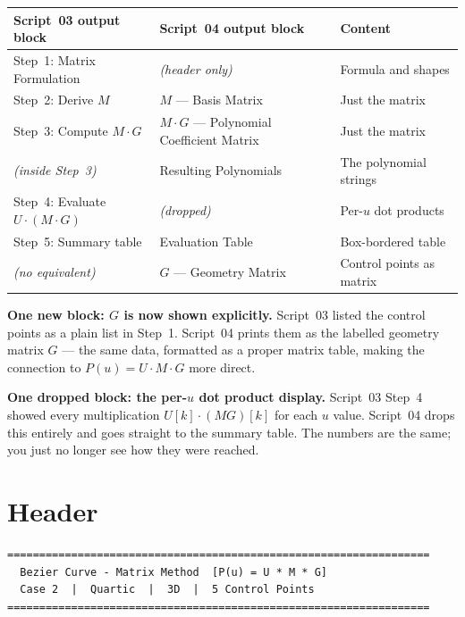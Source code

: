 \documentclass[12pt, a4paper]{article}
\begin{document}
\begin{center}
\begin{tabular}{lll}
\toprule
Script~03 output block & Script~04 output block & Content \\
\midrule
Step~1: Matrix Formulation & \textit{(header only)} & Formula and shapes \\
Step~2: Derive $M$ & $M$ --- Basis Matrix & Just the matrix \\
Step~3: Compute $M \cdot G$ & $M \cdot G$ --- Polynomial Coefficient Matrix & Just the matrix \\
\textit{(inside Step~3)} & Resulting Polynomials & The polynomial strings \\
Step~4: Evaluate $U \cdot (M \cdot G)$ & \textit{(dropped)} & Per-$u$ dot products \\
Step~5: Summary table & Evaluation Table & Box-bordered table \\
\midrule
\textit{(no equivalent)} & $G$ --- Geometry Matrix & Control points as matrix \\
\bottomrule
\end{tabular}
\end{center}

\begin{notebox}
\textbf{One new block: $G$ is now shown explicitly.}
Script~03 listed the control points as a plain list in Step~1.
Script~04 prints them as the labelled geometry matrix $G$
--- the same data, formatted as a proper matrix table,
making the connection to $P(u) = U \cdot M \cdot G$ more direct.

\textbf{One dropped block: the per-$u$ dot product display.}
Script~03 Step~4 showed every multiplication
$U[k] \cdot (MG)[k]$ for each $u$ value.
Script~04 drops this entirely and goes straight to the
summary table.
The numbers are the same; you just no longer see how they
were reached.
\end{notebox}


\section{Header}

\begin{verbatim}
==================================================================
  Bezier Curve - Matrix Method  [P(u) = U * M * G]
  Case 2  |  Quartic  |  3D  |  5 Control Points
==================================================================
\end{verbatim}
\end{document}

